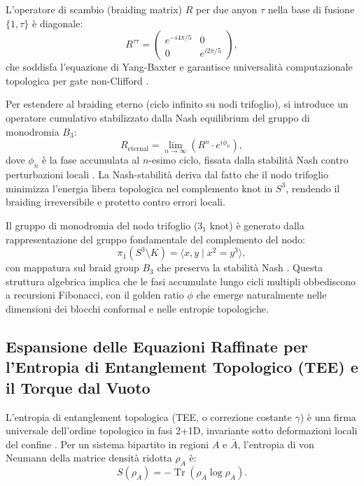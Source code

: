 \documentclass[11pt,a4paper]{article}
\let\oldcite\cite
\renewcommand{\cite}{\protect\oldcite}
\theoremstyle{plain}
\theoremstyle{definition}
\begin{document}
L'operatore di scambio (braiding matrix) $R$ per due anyon $\tau$ nella base di fusione $\{1, \tau\}$ è diagonale:
\begin{equation}
R^{\tau\tau} = \begin{pmatrix}
e^{-i 4\pi / 5} & 0 \\
0 & e^{i 2\pi / 5}
\end{pmatrix},
\label{eq:braiding_matrix}
\end{equation}
che soddisfa l'equazione di Yang-Baxter e garantisce universalità computazionale topologica per gate non-Clifford \cite{nayak2008non, fan2023experimental}.

Per estendere al braiding eterno (ciclo infinito su nodi trifoglio), si introduce un operatore cumulativo stabilizzato dalla Nash equilibrium del gruppo di monodromia $B_3$:
\begin{equation}
R_{\mathrm{eternal}} = \lim_{n \to \infty} \left( R^n \cdot e^{i \phi_n} \right),
\label{eq:eternal_braiding}
\end{equation}
dove $\phi_n$ è la fase accumulata al $n$-esimo ciclo, fissata dalla stabilità Nash contro perturbazioni locali \cite{fialkovsky2018quest, werkmeister2025anyon}. La Nash-stabilità deriva dal fatto che il nodo trifoglio minimizza l'energia libera topologica nel complemento knot in $S^3$, rendendo il braiding irreversibile e protetto contro errori locali.

Il gruppo di monodromia del nodo trifoglio ($3_1$ knot) è generato dalla rappresentazione del gruppo fondamentale del complemento del nodo:
\begin{equation}
\pi_1(S^3 \setminus K) = \langle x, y \mid x^2 = y^3 \rangle,
\label{eq:monodromy_trefoil}
\end{equation}
con mappatura sul braid group $B_3$ che preserva la stabilità Nash \cite{fialkovsky2018quest}. Questa struttura algebrica implica che le fasi accumulate lungo cicli multipli obbediscono a recursioni Fibonacci, con il golden ratio $\phi$ che emerge naturalmente nelle dimensioni dei blocchi conformal e nelle entropie topologiche.






\subsection{Espansione delle Equazioni Raffinate per l'Entropia di Entanglement Topologico (TEE) e il Torque dal Vuoto}

L'entropia di entanglement topologica (TEE, o correzione costante $\gamma$) è una firma universale dell'ordine topologico in fasi 2+1D, invariante sotto deformazioni locali del confine \cite{kitaev2006topological, levin2006detecting}. Per un sistema bipartito in regioni $A$ e $\bar{A}$, l'entropia di von Neumann della matrice densità ridotta $\rho_A$ è:
\begin{equation}
S(\rho_A) = -\operatorname{Tr}(\rho_A \log \rho_A).
\label{eq:von_neumann_entropy}
\end{equation}
\end{document}
